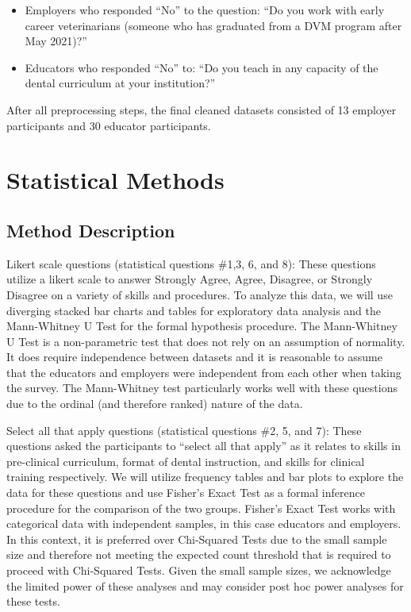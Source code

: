 \documentclass[
  11pt,
  letterpaper,
  DIV=11,
  numbers=noendperiod]{scrartcl}
\begin{document}
\begin{itemize}
\item
  Employers who responded ``No'' to the question: ``Do you work with
  early career veterinarians (someone who has graduated from a DVM
  program after May 2021)?''
\item
  Educators who responded ``No'' to: ``Do you teach in any capacity of
  the dental curriculum at your institution?''
\end{itemize}

After all preprocessing steps, the final cleaned datasets consisted of
13 employer participants and 30 educator participants.

\hypertarget{statistical-methods}{%
\section{Statistical Methods}\label{statistical-methods}}

\hypertarget{method-description}{%
\subsection{Method Description}\label{method-description}}

Likert scale questions (statistical questions \#1,3, 6, and 8): These
questions utilize a likert scale to answer Strongly Agree, Agree,
Disagree, or Strongly Disagree on a variety of skills and procedures. To
analyze this data, we will use diverging stacked bar charts and tables
for exploratory data analysis and the Mann-Whitney U Test for the formal
hypothesis procedure. The Mann-Whitney U Test is a non-parametric test
that does not rely on an assumption of normality. It does require
independence between datasets and it is reasonable to assume that the
educators and employers were independent from each other when taking the
survey. The Mann-Whitney test particularly works well with these
questions due to the ordinal (and therefore ranked) nature of the data.

Select all that apply questions (statistical questions \#2, 5, and 7):
These questions asked the participants to ``select all that apply'' as
it relates to skills in pre-clinical curriculum, format of dental
instruction, and skills for clinical training respectively. We will
utilize frequency tables and bar plots to explore the data for these
questions and use Fisher's Exact Test as a formal inference procedure
for the comparison of the two groups. Fisher's Exact Test works with
categorical data with independent samples, in this case educators and
employers. In this context, it is preferred over Chi-Squared Tests due
to the small sample size and therefore not meeting the expected count
threshold that is required to proceed with Chi-Squared Tests. Given the
small sample sizes, we acknowledge the limited power of these analyses
and may consider post hoc power analyses for these tests.
\end{document}
